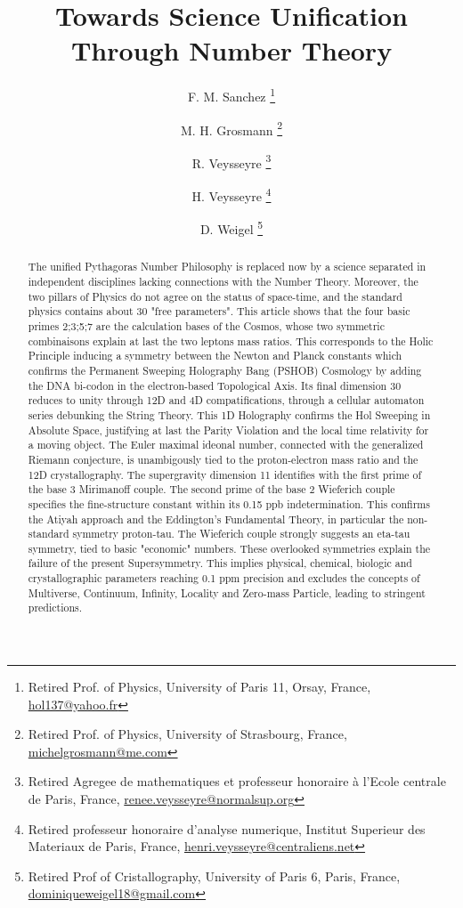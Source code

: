 \documentclass[a4paper,9pt]{article}
\title{Towards Science Unification Through Number Theory}
\author{F. M. Sanchez \thanks{Retired Prof. of Physics, University of Paris 11, Orsay, France, \href{mailto:hol137@yahoo.fr}{hol137@yahoo.fr}} 
   \and M. H. Grosmann \thanks{Retired Prof. of Physics, University of Strasbourg, France, \href{mailto:michelgrosmann@me.com}{michelgrosmann@me.com}}
   \and R. Veysseyre \thanks{Retired Agregee de mathematiques et professeur honoraire \`a l'Ecole centrale de Paris, France,
   \href{mailto:renee.veysseyre@normalsup.org}{renee.veysseyre@normalsup.org}}
   \and H. Veysseyre \thanks{Retired professeur honoraire d'analyse numerique, Institut Superieur des Materiaux de Paris, France,
   \href{mailto:henri.veysseyre@centraliens.net}{henri.veysseyre@centraliens.net}}
   \and D. Weigel  \thanks{Retired Prof of Cristallography, University of Paris 6, Paris, France, \href{mailto:dominiqueweigel18@gmail.com}{dominiqueweigel18@gmail.com}} 
   }
\newcounter{row}
\newcounter{col}
\begin{document}
\setcounter{page}{1}

\maketitle

\begin{abstract}






The unified Pythagoras Number Philosophy is replaced now by a science separated in independent disciplines lacking connections with the Number Theory. 
Moreover, the two pillars of Physics do not agree on the status of space-time, and the standard physics contains about 30 "free parameters".
This article shows that the four basic primes 2;3;5;7 are the calculation bases of the Cosmos, whose two symmetric combinaisons explain at last the two leptons mass ratios. This corresponds to the Holic Principle inducing a symmetry between the Newton and Planck constants which confirms the Permanent Sweeping Holography Bang (PSHOB) Cosmology by adding the DNA bi-codon in the electron-based Topological Axis. Its final dimension 30 reduces to unity through 12D and 4D compatifications, through a cellular automaton series debunking the String Theory. This 1D Holography confirms the Hol Sweeping in Absolute Space, justifying at last the Parity Violation and the local time relativity for a moving object. The Euler maximal ideonal number, connected with the generalized Riemann conjecture, is unambigously tied to the proton-electron mass ratio and the 12D crystallography. The supergravity dimension 11 identifies with the first prime of the base 3 Mirimanoff couple. The second prime of the base 2 Wieferich couple specifies the fine-structure constant within its 0.15 ppb indetermination. This confirms the Atiyah approach and the Eddington's Fundamental Theory, in particular the non-standard symmetry proton-tau. The Wieferich couple strongly suggests an eta-tau symmetry, tied to basic "economic" numbers. These overlooked symmetries explain the failure of the present Supersymmetry. This implies physical, chemical, biologic and crystallographic parameters reaching 0.1 ppm precision and excludes the concepts of Multiverse, Continuum, Infinity, Locality and Zero-mass Particle, leading to stringent predictions.











\end{abstract}
\end{document}
